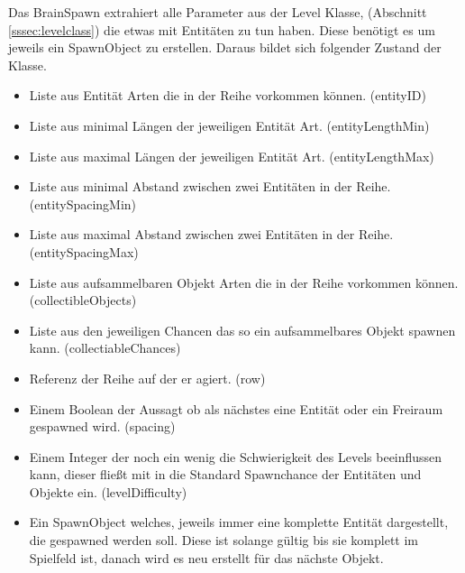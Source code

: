 \documentclass[a4paper,10pt]{report}
\begin{document}
{{{				Das BrainSpawn extrahiert alle Parameter aus der Level Klasse, (Abschnitt \ref{sssec:levelclass}) die etwas mit Entitäten zu tun haben.
				Diese benötigt es um jeweils ein SpawnObject zu erstellen.
				\newline \newline
				\noindent					
				Daraus bildet sich folgender Zustand der Klasse.
				
				\begin{itemize}
					\item Liste aus Entität Arten die in der Reihe vorkommen können. (entityID)
					\item Liste aus minimal Längen der jeweiligen Entität Art. (entityLengthMin)
					\item Liste aus maximal Längen der jeweiligen Entität Art. (entityLengthMax)
					\item Liste aus minimal Abstand zwischen zwei Entitäten in der Reihe. \\(entitySpacingMin)
					\item Liste aus maximal Abstand zwischen zwei Entitäten in der Reihe. \\(entitySpacingMax)
					\item Liste aus aufsammelbaren Objekt Arten die in der Reihe vorkommen können. (collectibleObjects)
					\item Liste aus den jeweiligen Chancen das so ein aufsammelbares Objekt spawnen kann. (collectiableChances)
					\item Referenz der Reihe auf der er agiert. (row)
					\item Einem Boolean der Aussagt ob als nächstes eine Entität oder ein Freiraum gespawned wird. (spacing)
					\item Einem Integer der noch ein wenig die Schwierigkeit des Levels beeinflussen kann, dieser fließt mit in die Standard Spawnchance der Entitäten und Objekte ein. (levelDifficulty)
					\item Ein SpawnObject welches, jeweils immer eine komplette Entität dargestellt, die gespawned werden soll. 
						  Diese ist solange gültig bis sie komplett im Spielfeld ist, danach wird es neu erstellt für das nächste Objekt. 
				\end{itemize}								
				
}}}
\end{document}
